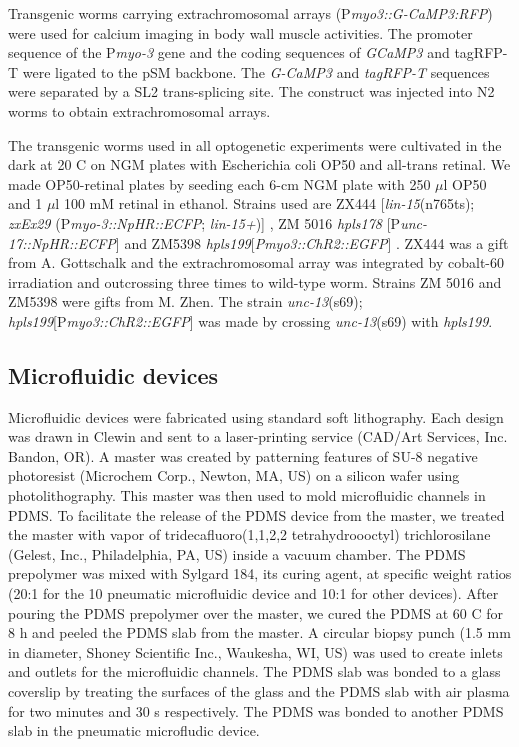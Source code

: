 Transgenic worms carrying extrachromosomal arrays (P\textit{myo3::G-CaMP3:RFP}) were used for 
calcium imaging in body wall muscle activities. The promoter sequence of the P\textit{myo-3} gene \citep{kuroyanagi_transgenic_2006} and the coding sequences of \textit{GCaMP3} and tagRFP-T were ligated to the pSM backbone. The \textit{G-CaMP3} and \textit{tagRFP-T} sequences were separated by a SL2 trans-splicing site. The construct was 
injected into N2 worms to obtain extrachromosomal arrays.  

The transgenic worms used in all optogenetic experiments were cultivated in the dark at 20 \textdegree C on 
NGM plates with Escherichia coli OP50 and all-trans retinal. We made OP50-retinal plates by 
seeding each 6-cm NGM plate with 250 $\mu$l OP50 and 1 $\mu$l 100 mM retinal in ethanol. Strains used are ZX444 [\textit{lin-15}(n765ts); \textit{zxEx29} (P\textit{myo-3::NpHR::ECFP}; \textit{lin-15+})] , ZM 5016 \textit{hpls178} [P\textit{unc-17::NpHR::ECFP}] and ZM5398 \textit{hpls199}[\textit{Pmyo3::ChR2::EGFP}] . ZX444 was a gift from A. Gottschalk and the extrachromosomal array was integrated by cobalt-60 irradiation and outcrossing three times to wild-type worm. Strains ZM 5016 and ZM5398 were gifts from M. Zhen. The strain \textit{unc-13}(s69); \textit{hpls199}[P\textit{myo3::ChR2::EGFP}] was made by crossing \textit{unc-13}(s69) with \textit{hpls199}. 

\subsection{Microfluidic devices} 
Microfluidic devices were fabricated using standard soft lithography. Each 
design was drawn in Clewin and sent to a laser-printing service (CAD/Art Services, Inc. Bandon, 
OR).  A master was created by patterning features of SU-8 negative photoresist (Microchem 
Corp., Newton, MA, US) on a silicon wafer using photolithography. This master was then used 
to mold microfluidic channels in PDMS. To facilitate the release of the PDMS device from the 
master, we treated the master with vapor of tridecafluoro(1,1,2,2 tetrahydroooctyl) 
trichlorosilane (Gelest, Inc., Philadelphia, PA, US) inside a vacuum chamber. The PDMS 
prepolymer was mixed with Sylgard 184, its curing agent, at specific weight ratios (20:1 for the 
 10
pneumatic microfluidic device and 10:1 for other devices). After pouring the PDMS prepolymer 
over the master, we cured the PDMS at 60 \textdegree C for 8 h and peeled the PDMS slab from the master. 
A circular biopsy punch (1.5 mm in diameter, Shoney Scientific Inc., Waukesha, WI, US) was used to 
create inlets and outlets for the microfluidic channels. The PDMS slab was bonded to a glass 
coverslip by treating the surfaces of the glass and the PDMS slab with air plasma for two 
minutes and 30 s respectively. The PDMS was bonded to another PDMS slab in the 
pneumatic microfludic device.


